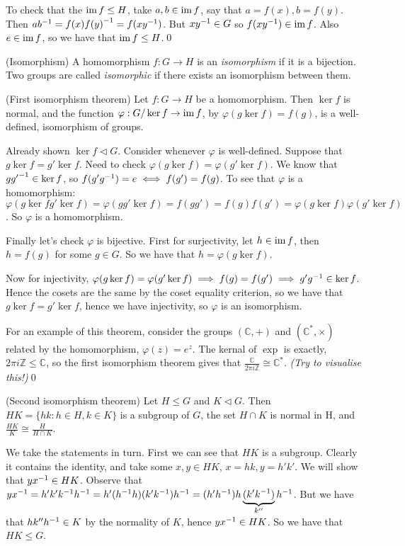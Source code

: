\documentclass{article}
\newcommand{\nrm}{\triangleleft}
\begin{document}
To check that the $ \operatorname{im} f \le H $, take $ a,b\in \operatorname{im} f $, say that $ a=f(x), b=f(y) $. Then $ a{b}^{-1}=f(x){f(y)}^{-1}=f(x{y}^{-1}) $. But $ x{y}^{-1}\in G $ so $ f(x{y}^{-1})\in \operatorname{im} f $. Also $ e\in \operatorname{im} f $, so we have that $ \operatorname{im} f\le H $.\qed
\begin{definition}
	(Isomorphism) A homomorphism $ f:G\rightarrow H $ is an \textit{isomorphism} if it is a bijection. Two groups are called \textit{isomorphic} if there exists an isomorphism between them.
\end{definition}
\begin{theorem}
	(First isomorphism theorem) Let $ f:G\to H $ be a homomorphism. Then $ \ker f $ is normal, and the function $ \varphi:G/\ker f\rightarrow \operatorname{im} f $, by $ \varphi(g\ker f)=f(g) $, is a well-defined, isomorphism of groups.
\end{theorem}
\pf Already shown $ \ker f\nrm G $. Consider whenever $ \varphi $ is well-defined. Suppose that $ g\ker f=g'\ker f. $ Need to check $ \varphi(g\ker f)=\varphi(g'\ker f). $ We know that $ g{g'}^{-1}\in \ker f $, so $ f(g'{g}^{-1})=e\iff f(g')=f(g) $. To see that $ \varphi $ is a homomorphism: $ \varphi(g\ker f g'\ker f)=\varphi(gg'\ker f)=f(gg')=f(g)f(g')=\varphi(g\ker f)\varphi(g'\ker f) $. So $ \varphi $ is a homomorphism.

\par
Finally let's check $ \varphi $ is bijective. First for surjectivity, let $ h\in \operatorname{im} f $, then $ h=f(g) $ for some $ g\in G $. So we have that $ h=\varphi(g\ker f) $.

Now for injectivity, $ \varphi(g\ker f)=\varphi(g'\ker f)\implies f(g)=f(g') \implies g'{g}^{-1}\in\ker f $. Hence the cosets are the same by the coset equality criterion, so we have that $ g\ker f=g'\ker f $, hence we have injectivity, so $ \varphi $ is an isomorphism.

\par
For an example of this theorem, consider the groups $ (\mathbb C, +) $ and $ (\mathbb C^*, \times) $ related by the homomorphism, $ \varphi(z)= e^z$. The kernal of $ \exp $ is exactly, $ 2\pi i \mathbb Z\le \mathbb C $, so the first isomorphism theorem gives that $ \frac{\mathbb C}{2\pi i \mathbb Z}\cong \mathbb C^* $. \textit{(Try to visualise this!)}\qed 
\begin{theorem}
	(Second isomorphism theorem) Let $ H\le G $ and $ K\nrm G $. Then $ HK=\{hk : h\in H, k\in K\} $ is a subgroup of $ G $, the set $ H\cap K$ is normal in H, and $ \frac{HK}K\cong \frac H{H\cap K} $.
\end{theorem}
\pf We take the statements in turn. First we can see that $ HK $ is a subgroup. Clearly it contains the identity, and take some $ x,y\in HK $, $ x=hk, y=h'k' $. We will show that $ y{x}^{-1}\in HK $. Observe that $ y{x}^{-1} = h'k'{k}^{-1} {h}^{-1} = h'({h}^{-1} h)(k' {k}^{-1}){h}^{-1} = (h'{h}^{-1})h\underbrace{(k'{k}^{-1})}_{k''}{h}^{-1} $. But we have that $ hk''{h}^{-1} \in K $ by the normality of $ K $, hence $ y{x}^{-1} \in HK $. So we have that $ HK\le G $.
\end{document}
